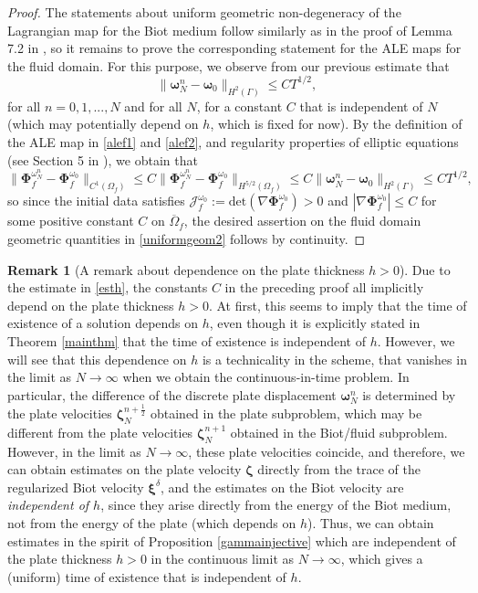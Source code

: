\documentclass[11pt]{article}
\newcommand{\bd}{\boldsymbol}
\theoremstyle{definition}
\newtheorem{remark}{Remark}[section]
\begin{document}
\begin{proof}
The statements about uniform geometric non-degeneracy of the Lagrangian map for the Biot medium follow similarly as in the proof of Lemma 7.2 in \cite{FPSIJMPA}, so it remains to prove the corresponding statement for the ALE maps for the fluid domain. For this purpose, we observe from our previous estimate that 
\begin{equation*}
\|\bd{\omega}^{n}_{N} - \bd{\omega}_{0}\|_{H^{2}(\Gamma)} \le CT^{1/2},
\end{equation*}
for all $n = 0, 1, ..., N$ and for all $N$, for a constant $C$ that is independent of $N$ (which may potentially depend on $h$, which is fixed for now). By the definition of the ALE map in \eqref{alef1} and \eqref{alef2}, and regularity properties of elliptic equations (see Section 5 in \cite{Grisvard}), we obtain that
\begin{equation*}
\|\bd{\Phi}^{\omega^{n}_{N}}_{f} - \bd{\Phi}^{\omega_{0}}_{f}\|_{C^{1}(\Omega_{f})} \le C\|\bd{\Phi}^{\omega^{n}_{N}}_{f} - \bd{\Phi}^{\omega_{0}}_{f}\|_{H^{5/2}(\Omega_{f})} \le C\|\bd{\omega}^{n}_{N} - \bd{\omega}_{0}\|_{H^{2}(\Gamma)} \le CT^{1/2},
\end{equation*}
so since the initial data satisfies $\mathcal{J}^{\omega_{0}}_{f} := \text{det}(\nabla \bd{\Phi}^{\omega_{0}}_{f}) > 0$ and $|\nabla \bd{\Phi}^{\omega_{0}}_{f}| \le C$ for some positive constant $C$ on $\overline{\Omega}_{f}$, the desired assertion on the fluid domain geometric quantities in \eqref{uniformgeom2} follows by continuity.  
\end{proof}

\begin{remark}[A remark about dependence on the plate thickness $h > 0$]
Due to the estimate in \eqref{esth}, the constants $C$ in the preceding proof all implicitly depend on the plate thickness $h > 0$. At first, this seems to imply that the time of existence of a solution depends on $h$, even though it is explicitly stated in Theorem \ref{mainthm} that the time of existence is independent of $h$. However, we will see that this dependence on $h$ is a technicality in the scheme, that vanishes in the limit as $N \to \infty$ when we obtain the continuous-in-time problem. In particular, the difference of the discrete plate displacement $\bd{\omega}^{n}_{N}$ is determined by the plate velocities $\bd{\zeta}^{n + \frac{1}{2}}_{N}$ obtained in the plate subproblem, which may be different from the plate velocities $\bd{\zeta}^{n + 1}_{N}$ obtained in the Biot/fluid subproblem. However, in the limit as $N \to \infty$, these plate velocities coincide, and therefore, we can obtain estimates on the plate velocity $\bd{\zeta}$ directly from the trace of the regularized Biot velocity $\bd{\xi}^{\delta}$, and the estimates on the Biot velocity are \textit{independent of $h$}, since they arise directly from the energy of the Biot medium, not from the energy of the plate (which depends on $h$). Thus, we can obtain estimates in the spirit of Proposition \ref{gammainjective} which are independent of the plate thickness $h > 0$ in the continuous limit as $N \to \infty$, which gives a (uniform) time of existence that is independent of $h$. 
\end{remark}
\end{document}
